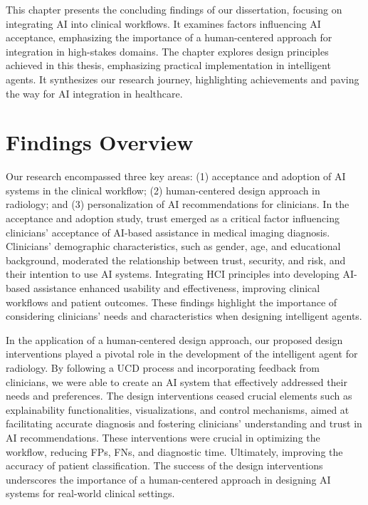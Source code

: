 \clearpage
\label{chap:chap008}

This chapter presents the concluding findings of our dissertation, focusing on integrating \ac{AI} into clinical workflows.
It examines factors influencing \ac{AI} acceptance, emphasizing the importance of a human-centered approach for integration in high-stakes domains.
The chapter explores design principles achieved in this thesis, emphasizing practical implementation in intelligent agents.
It synthesizes our research journey, highlighting achievements and paving the way for \ac{AI} integration in healthcare.

\section{Findings Overview}
\label{sec:chap008001}

Our research encompassed three key areas:
(1) acceptance and adoption of \ac{AI} systems in the clinical workflow;
(2) human-centered design approach in radiology; and
(3) personalization of \ac{AI} recommendations for clinicians.
In the acceptance and adoption study, trust emerged as a critical factor influencing clinicians' acceptance of \ac{AI}-based assistance in medical imaging diagnosis.
Clinicians' demographic characteristics, such as gender, age, and educational background, moderated the relationship between trust, security, and risk, and their intention to use \ac{AI} systems.
Integrating \ac{HCI} principles into developing \ac{AI}-based assistance enhanced usability and effectiveness, improving clinical workflows and patient outcomes.
These findings highlight the importance of considering clinicians' needs and characteristics when designing intelligent agents.

In the application of a human-centered design approach, our proposed design interventions played a pivotal role in the development of the intelligent agent for radiology.
By following a \ac{UCD} process and incorporating feedback from clinicians, we were able to create an \ac{AI} system that effectively addressed their needs and preferences.
The design interventions ceased crucial elements such as explainability functionalities, visualizations, and control mechanisms, aimed at facilitating accurate diagnosis and fostering clinicians' understanding and trust in \ac{AI} recommendations.
These interventions were crucial in optimizing the workflow, reducing \acp{FP}, \acp{FN}, and diagnostic time.
Ultimately, improving the accuracy of patient classification.
The success of the design interventions underscores the importance of a human-centered approach in designing \ac{AI} systems for real-world clinical settings.

